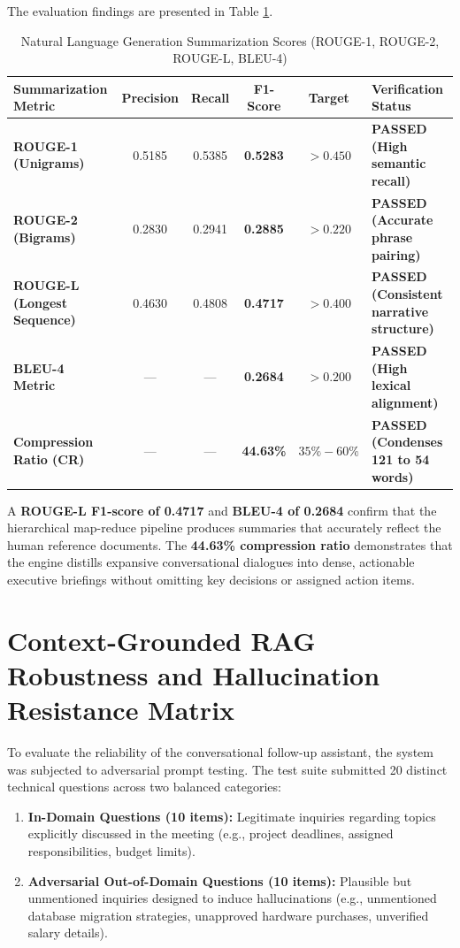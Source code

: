 \documentclass[12pt,oneside,letterpaper]{report}
\numberwithin{equation}{chapter} %
\begin{document}
The evaluation findings are presented in Table \ref{tab:summarization_scores}.

\begin{table}[H]
\centering
\caption{Natural Language Generation Summarization Scores (ROUGE-1, ROUGE-2, ROUGE-L, BLEU-4)}
\label{tab:summarization_scores}
\footnotesize
\begin{tabularx}{\textwidth}{p{5.0cm}c c c c X}
\toprule
\textbf{Summarization Metric} & \textbf{Precision} & \textbf{Recall} & \textbf{F1-Score} & \textbf{Target} & \textbf{Verification Status} \\
\midrule
\textbf{ROUGE-1 (Unigrams)} & 0.5185 & 0.5385 & \textbf{0.5283} & $> 0.450$ & \textbf{PASSED (High semantic recall)} \\
\textbf{ROUGE-2 (Bigrams)} & 0.2830 & 0.2941 & \textbf{0.2885} & $> 0.220$ & \textbf{PASSED (Accurate phrase pairing)} \\
\textbf{ROUGE-L (Longest Sequence)} & 0.4630 & 0.4808 & \textbf{0.4717} & $> 0.400$ & \textbf{PASSED (Consistent narrative structure)} \\
\textbf{BLEU-4 Metric} & --- & --- & \textbf{0.2684} & $> 0.200$ & \textbf{PASSED (High lexical alignment)} \\
\textbf{Compression Ratio (CR)} & --- & --- & \textbf{44.63\%} & $35\% - 60\%$ & \textbf{PASSED (Condenses 121 to 54 words)} \\
\bottomrule
\end{tabularx}
\end{table}

A \textbf{ROUGE-L F1-score of 0.4717} and \textbf{BLEU-4 of 0.2684} confirm that the hierarchical map-reduce pipeline produces summaries that accurately reflect the human reference documents. The \textbf{44.63\% compression ratio} demonstrates that the engine distills expansive conversational dialogues into dense, actionable executive briefings without omitting key decisions or assigned action items.

\section{Context-Grounded RAG Robustness and Hallucination Resistance Matrix}
To evaluate the reliability of the conversational follow-up assistant, the system was subjected to adversarial prompt testing. The test suite submitted 20 distinct technical questions across two balanced categories:
\begin{enumerate}
    \item \textbf{In-Domain Questions (10 items):} Legitimate inquiries regarding topics explicitly discussed in the meeting (e.g., project deadlines, assigned responsibilities, budget limits).
    \item \textbf{Adversarial Out-of-Domain Questions (10 items):} Plausible but unmentioned inquiries designed to induce hallucinations (e.g., unmentioned database migration strategies, unapproved hardware purchases, unverified salary details).
\end{enumerate}
\end{document}

